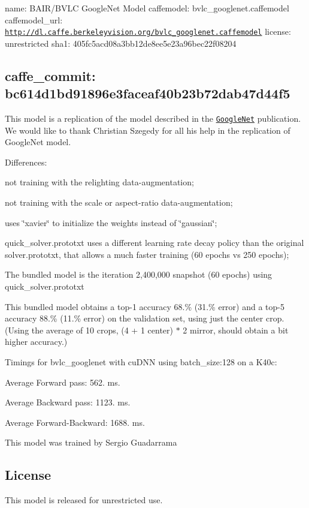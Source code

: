 

 name\+: B\+A\+I\+R/\+B\+V\+LC Google\+Net Model caffemodel\+: bvlc\+\_\+googlenet.\+caffemodel caffemodel\+\_\+url\+: \href{http://dl.caffe.berkeleyvision.org/bvlc_googlenet.caffemodel}{\tt http\+://dl.\+caffe.\+berkeleyvision.\+org/bvlc\+\_\+googlenet.\+caffemodel} license\+: unrestricted sha1\+: 405fc5acd08a3bb12de8ee5e23a96bec22f08204 \subsection*{caffe\+\_\+commit\+: bc614d1bd91896e3faceaf40b23b72dab47d44f5 }

This model is a replication of the model described in the \href{http://arxiv.org/abs/1409.4842}{\tt Google\+Net} publication. We would like to thank Christian Szegedy for all his help in the replication of Google\+Net model.

Differences\+:
\begin{DoxyItemize}
\item not training with the relighting data-\/augmentation;
\item not training with the scale or aspect-\/ratio data-\/augmentation;
\item uses \char`\"{}xavier\char`\"{} to initialize the weights instead of \char`\"{}gaussian\char`\"{};
\item quick\+\_\+solver.\+prototxt uses a different learning rate decay policy than the original solver.\+prototxt, that allows a much faster training (60 epochs vs 250 epochs);
\end{DoxyItemize}

The bundled model is the iteration 2,400,000 snapshot (60 epochs) using quick\+\_\+solver.\+prototxt

This bundled model obtains a top-\/1 accuracy 68.\% (31.\% error) and a top-\/5 accuracy 88.\% (11.\% error) on the validation set, using just the center crop. (Using the average of 10 crops, (4 + 1 center) $\ast$ 2 mirror, should obtain a bit higher accuracy.)

Timings for bvlc\+\_\+googlenet with cu\+D\+NN using batch\+\_\+size\+:128 on a K40c\+:
\begin{DoxyItemize}
\item Average Forward pass\+: 562. ms.
\item Average Backward pass\+: 1123. ms.
\item Average Forward-\/\+Backward\+: 1688. ms.
\end{DoxyItemize}

This model was trained by Sergio Guadarrama 

\subsection*{License}

This model is released for unrestricted use. 